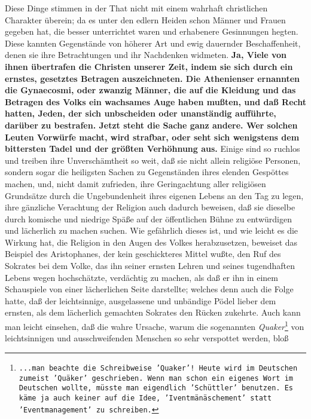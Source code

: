 {Diese Dinge stimmen in der That nicht mit einem wahrhaft christlichen Charakter
überein; da es unter den edlern Heiden schon Männer und
Frauen gegeben hat, die
besser unterrichtet waren und erhabenere Gesinnungen hegten. Diese kannten
Gegenstände von höherer Art und ewig dauernder Beschaffenheit, denen sie ihre
Betrachtungen und ihr Nachdenken widmeten. \textbf{Ja,
Viele von ihnen übertrafen die
Christen unserer Zeit, indem sie sich durch ein ernstes, gesetztes Betragen
auszeichneten. Die Athenienser ernannten die Gynaecosmi, oder zwanzig Männer,
die auf die Kleidung und das Betragen des Volks ein wachsames Auge haben mußten,
und daß Recht hatten, Jeden, der sich unbscheiden oder unanständig aufführte,
darüber zu bestrafen. Jetzt steht die Sache ganz andere. Wer solchen Leuten
Vorwürfe macht, wird strafbar, oder seht sich wenigstens dem bittersten Tadel
und der größten Verhöhnung aus.} Einige sind so ruchlos und treiben ihre
Unverschämtheit so weit, daß sie nicht allein religiöse Personen, sondern sogar
die heiligsten Sachen zu Gegenständen ihres elenden Gespöttes machen, und, nicht
damit zufrieden, ihre Geringachtung aller religiösen Grundsätze durch die
Ungebundenheit ihres eigenen Lebens an den Tag zu legen, ihre gänzliche
Verachtung der Religion auch dadurch beweisen, daß sie dieselbe durch komische
und niedrige Späße auf der öffentlichen Bühne zu entwürdigen und lächerlich zu
machen suchen. Wie gefährlich dieses ist, und wie leicht es die Wirkung hat, die
Religion in den Augen des Volkes herabzusetzen, beweiset das Beispiel des
Aristophanes, der kein geschickteres Mittel wußte,
den Ruf des Sokrates bei dem
Volke, das ihn seiner ernsten Lehren und seines tugendhaften Lebens wegen
hochschätzte, verdächtig zu machen, als daß er ihn in einem Schauspiele von
einer lächerlichen Seite darstellte; welches denn auch die Folge hatte, daß der
leichtsinnige, ausgelassene und unbändige Pödel lieber
dem ernsten, als dem
lächerlich gemachten Sokrates den Rücken zukehrte. Auch kann man leicht
einsehen, daß die wahre Ursache, warum die sogenannten
\textit{Quaker}\footnote{\texttt{...man beachte die Schreibweise
'Quaker'! Heute wird im Deutschen zumeist 'Quäker' geschrieben. Wenn man schon ein eigenes Wort im Deutschen wollte, müsste man eigendlich 'Schüttler' benutzen. Es käme ja auch keiner auf die Idee, 'Iventmänäschement' statt 'Eventmanagement' zu schreiben.}} von
leichtsinnigen und ausschweifenden Menschen so sehr verspottet werden, bloß
}
